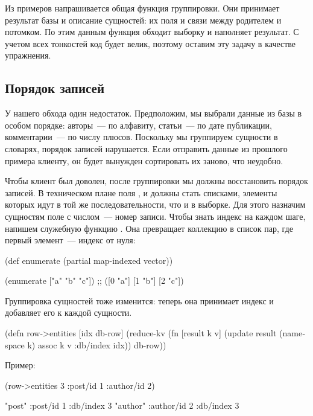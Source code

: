 Из примеров напрашивается общая функция группировки. Они принимает результат базы и описание сущностей: их поля и связи между родителем и потомком. По этим данным функция обходит выборку и наполняет результат. С учетом всех тонкостей код будет велик, поэтому оставим эту задачу в качестве упражнения.

\subsection{Порядок записей}

У нашего обхода один недостаток. Предположим, мы выбрали данные из базы в особом порядке: авторы~--- по алфавиту, статьи~--- по дате публикации, комментарии~--- по числу плюсов. Поскольку мы группируем сущности в словарях, порядок записей нарушается. Если отправить данные из прошлого примера клиенту, он будет вынужден сортировать их заново, что неудобно.

Чтобы клиент был доволен, после группировки мы должны восстановить порядок записей. В техническом плане поля ,  и  должны стать списками, элементы которых идут в той же последовательности, что и в выборке. Для этого назначим сущностям поле  с числом~--- номер записи. Чтобы знать индекс на каждом шаге, напишем служебную функцию . Она превращает коллекцию в список пар, где первый элемент~--- индекс от нуля:

\begin{english}
  \begin{clojure}
(def enumerate
  (partial map-indexed vector))

(enumerate ["a" "b" "c"])
;; ([0 "a"] [1 "b"] [2 "c"])
  \end{clojure}
\end{english}

Группировка сущностей тоже изменится: теперь она принимает индекс и добавляет его к каждой сущности.

\begin{english}
  \begin{clojure}
(defn row->entities [idx db-row]
  (reduce-kv
   (fn [result k v]
     (update result
             (namespace k)
             assoc
             k v
             :db/index idx))
   {}
   db-row))
  \end{clojure}
\end{english}

Пример:

\begin{english}
  \begin{clojure}
(row->entities 3 {:post/id 1 :author/id 2})

{"post" {:post/id 1 :db/index 3}
 "author" {:author/id 2 :db/index 3}}
  \end{clojure}
\end{english}

